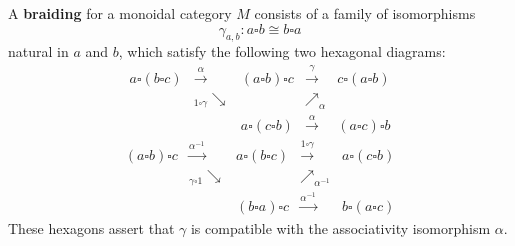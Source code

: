 A \textbf{braiding} for a monoidal category $M$ consists of a family of isomorphisms
$$\gamma_{a,b} : a \square b \cong b \square a$$
natural in $a$ and $b$, which satisfy the following two hexagonal diagrams:
\[
\begin{array}{ccc}
a \square (b \square c) & \xrightarrow{\alpha} & (a \square b) \square c & \xrightarrow{\gamma} & c \square (a \square b) \\
& {}_{1 \square \gamma} \searrow & & \nearrow_{\alpha} \\
& & a \square (c \square b) & \xrightarrow{\alpha} & (a \square c) \square b
\end{array}
\]
\[
\begin{array}{ccc}
(a \square b) \square c & \xrightarrow{\alpha^{-1}} & a \square (b \square c) & \xrightarrow{1 \square \gamma} & a \square (c \square b) \\
& {}_{\gamma \square 1} \searrow & & \nearrow_{\alpha^{-1}} \\
& & (b \square a) \square c & \xrightarrow{\alpha^{-1}} & b \square (a \square c)
\end{array}
\]
These hexagons assert that $\gamma$ is compatible with the associativity isomorphism $\alpha$.
